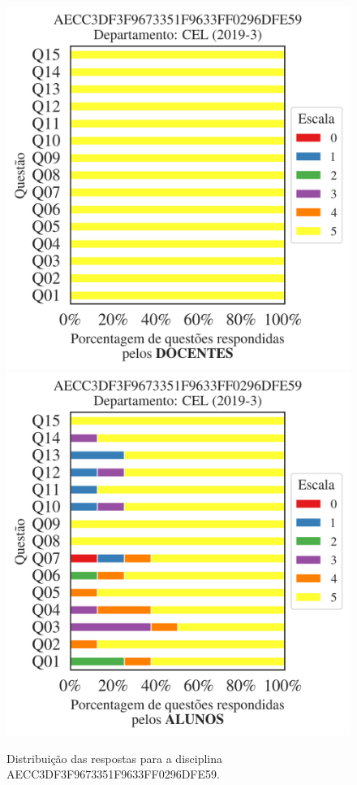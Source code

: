 \documentclass[a4paper,10pt]{article}
\begin{document}
\begin{figure}[h]
\centering
\includegraphics[width=0.485\linewidth]{analise_disciplina_departamento_CEL_AECC3DF3F9673351F9633FF0296DFE59_docentes.png}
\includegraphics[width=0.485\linewidth]{analise_disciplina_departamento_CEL_AECC3DF3F9673351F9633FF0296DFE59_alunos.png}
\caption{\label{fig:analise_geral_departamento}                Distribuição das respostas para a disciplina AECC3DF3F9673351F9633FF0296DFE59. }
\end{figure}
\end{document}
